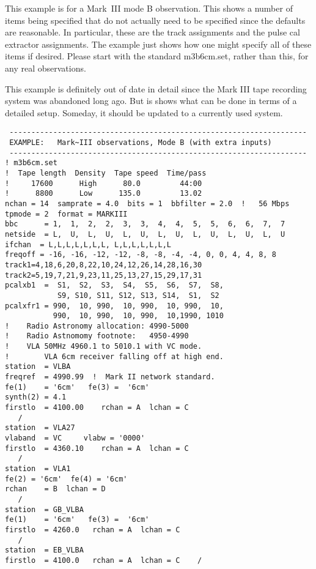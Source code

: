 \documentclass{report}
\begin{document}
This example is for a Mark~III mode B observation.  This shows a
number of items being specified that do not actually need to be
specified since the defaults are reasonable.  In particular, these
are the track assignments and the pulse cal extractor assignments.
The example just shows how one might specify all of these items
if desired.  Please start with the standard m3b6cm.set, rather than
this, for any real observations.

This example is definitely out of date in detail since the Mark III
tape recording system was abandoned long ago.  But is shows what can
be done in terms of a detailed setup.  Someday, it should be updated
to a currently used system.


\begin{verbatim}
 --------------------------------------------------------------------
 EXAMPLE:   Mark~III observations, Mode B (with extra inputs)
 --------------------------------------------------------------------
! m3b6cm.set
!  Tape length  Density  Tape speed  Time/pass
!     17600      High      80.0         44:00
!      8800      Low      135.0         13.02
nchan = 14  samprate = 4.0  bits = 1  bbfilter = 2.0  !   56 Mbps
tpmode = 2  format = MARKIII
bbc      = 1,  1,  2,  2,  3,  3,  4,  4,  5,  5,  6,  6,  7,  7
netside  = L,  U,  L,  U,  L,  U,  L,  U,  L,  U,  L,  U,  L,  U
ifchan  = L,L,L,L,L,L,L, L,L,L,L,L,L,L
freqoff = -16, -16, -12, -12, -8, -8, -4, -4, 0, 0, 4, 4, 8, 8
track1=4,18,6,20,8,22,10,24,12,26,14,28,16,30
track2=5,19,7,21,9,23,11,25,13,27,15,29,17,31
pcalxb1  =  S1,  S2,  S3,  S4,  S5,  S6,  S7,  S8,
            S9, S10, S11, S12, S13, S14,  S1,  S2
pcalxfr1 = 990,  10, 990,  10, 990,  10, 990,  10,
           990,  10, 990,  10, 990,  10,1990, 1010
!    Radio Astronomy allocation: 4990-5000
!    Radio Astnomomy footnote:   4950-4990
!    VLA 50MHz 4960.1 to 5010.1 with VC mode.
!        VLA 6cm receiver falling off at high end.
station  = VLBA
freqref  = 4990.99  !  Mark II network standard.
fe(1)    = '6cm'   fe(3) =  '6cm'
synth(2) = 4.1
firstlo  = 4100.00    rchan = A  lchan = C
   /
station  = VLA27
vlaband  = VC     vlabw = '0000'
firstlo  = 4360.10    rchan = A  lchan = C
   /
station  = VLA1
fe(2) = '6cm'  fe(4) = '6cm'
rchan    = B  lchan = D
   /
station  = GB_VLBA
fe(1)    = '6cm'   fe(3) =  '6cm'
firstlo  = 4260.0   rchan = A  lchan = C
   /
station  = EB_VLBA
firstlo  = 4100.0   rchan = A  lchan = C    /
\end{verbatim}
\end{document}
